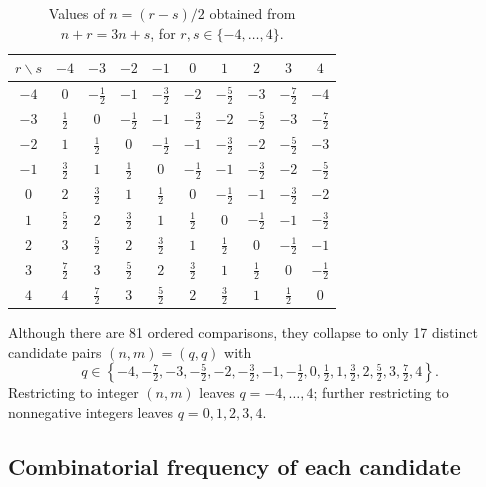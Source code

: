 \documentclass[11pt]{article}
\begin{document}
\begin{table}[htbp]
\centering
\caption{Values of $n=(r-s)/2$ obtained from $n+r=3n+s$, for $r,s\in\{-4,\dots,4\}$.}
\label{tab:nvalues}
\small
\begin{tabular}{c|ccccccccc}
\toprule
$r\backslash s$ & $-4$ & $-3$ & $-2$ & $-1$ & $0$ & $1$ & $2$ & $3$ & $4$ \\
\midrule
$-4$ & $0$    & $-\tfrac12$ & $-1$   & $-\tfrac32$ & $-2$ & $-\tfrac52$ & $-3$ & $-\tfrac72$ & $-4$ \\
$-3$ & $\tfrac12$ & $0$    & $-\tfrac12$ & $-1$   & $-\tfrac32$ & $-2$ & $-\tfrac52$ & $-3$ & $-\tfrac72$ \\
$-2$ & $1$    & $\tfrac12$ & $0$    & $-\tfrac12$ & $-1$   & $-\tfrac32$ & $-2$ & $-\tfrac52$ & $-3$ \\
$-1$ & $\tfrac32$ & $1$    & $\tfrac12$ & $0$    & $-\tfrac12$ & $-1$   & $-\tfrac32$ & $-2$ & $-\tfrac52$ \\
$0$  & $2$    & $\tfrac32$ & $1$    & $\tfrac12$ & $0$    & $-\tfrac12$ & $-1$   & $-\tfrac32$ & $-2$ \\
$1$  & $\tfrac52$ & $2$    & $\tfrac32$ & $1$    & $\tfrac12$ & $0$    & $-\tfrac12$ & $-1$   & $-\tfrac32$ \\
$2$  & $3$    & $\tfrac52$ & $2$    & $\tfrac32$ & $1$    & $\tfrac12$ & $0$    & $-\tfrac12$ & $-1$ \\
$3$  & $\tfrac72$ & $3$    & $\tfrac52$ & $2$    & $\tfrac32$ & $1$    & $\tfrac12$ & $0$    & $-\tfrac12$ \\
$4$  & $4$    & $\tfrac72$ & $3$    & $\tfrac52$ & $2$    & $\tfrac32$ & $1$    & $\tfrac12$ & $0$ \\
\bottomrule
\end{tabular}
\end{table}

Although there are 81 ordered comparisons, they collapse to only 17 distinct candidate
pairs $(n,m)=(q,q)$ with
\begin{equation}
q\in\left\{-4,-\tfrac72,-3,-\tfrac52,-2,-\tfrac32,-1,-\tfrac12,0,\tfrac12,1,\tfrac32,2,\tfrac52,3,\tfrac72,4\right\}.
\end{equation}
Restricting to integer $(n,m)$ leaves $q=-4,\dots,4$; further restricting to nonnegative
integers leaves $q=0,1,2,3,4$.

\subsection{Combinatorial frequency of each candidate}
\end{document}
